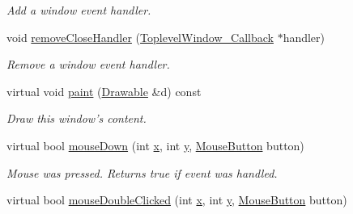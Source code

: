 \begin{DoxyCompactItemize}
\begin{DoxyCompactList}\small\item\em Add a window event handler. \end{DoxyCompactList}\item 
\hypertarget{classGUI_1_1ToplevelWindow_a378d60dec37b6321b97cdd971e9a7b50}{void \hyperlink{classGUI_1_1ToplevelWindow_a378d60dec37b6321b97cdd971e9a7b50}{remove\-Close\-Handler} (\hyperlink{structGUI_1_1ToplevelWindow__Callback}{Toplevel\-Window\-\_\-\-Callback} $\ast$handler)}\label{classGUI_1_1ToplevelWindow_a378d60dec37b6321b97cdd971e9a7b50}

\begin{DoxyCompactList}\small\item\em Remove a window event handler. \end{DoxyCompactList}\item 
\hypertarget{classGUI_1_1ToplevelWindow_afa0a4bb06257a13ba1a36857b86d1c04}{virtual void \hyperlink{classGUI_1_1ToplevelWindow_afa0a4bb06257a13ba1a36857b86d1c04}{paint} (\hyperlink{classGUI_1_1Drawable}{Drawable} \&d) const }\label{classGUI_1_1ToplevelWindow_afa0a4bb06257a13ba1a36857b86d1c04}

\begin{DoxyCompactList}\small\item\em Draw this window's content. \end{DoxyCompactList}\item 
\hypertarget{classGUI_1_1ToplevelWindow_aac0ee5b192f8f8c19d16e9326105cd89}{virtual bool \hyperlink{classGUI_1_1ToplevelWindow_aac0ee5b192f8f8c19d16e9326105cd89}{mouse\-Down} (int \hyperlink{classGUI_1_1Window_a6ca6a80ca00c9e1d8ceea8d3d99a657d}{x}, int \hyperlink{classGUI_1_1Window_a0ee8e923aff2c3661fc2e17656d37adf}{y}, \hyperlink{namespaceGUI_ad06082a7b02aa73697f39eb8e0856de9}{Mouse\-Button} button)}\label{classGUI_1_1ToplevelWindow_aac0ee5b192f8f8c19d16e9326105cd89}

\begin{DoxyCompactList}\small\item\em Mouse was pressed. Returns true if event was handled. \end{DoxyCompactList}\item 
\hypertarget{classGUI_1_1ToplevelWindow_a48816a1de37aeceea49ef4db9e47a3cc}{virtual bool \hyperlink{classGUI_1_1ToplevelWindow_a48816a1de37aeceea49ef4db9e47a3cc}{mouse\-Double\-Clicked} (int \hyperlink{classGUI_1_1Window_a6ca6a80ca00c9e1d8ceea8d3d99a657d}{x}, int \hyperlink{classGUI_1_1Window_a0ee8e923aff2c3661fc2e17656d37adf}{y}, \hyperlink{namespaceGUI_ad06082a7b02aa73697f39eb8e0856de9}{Mouse\-Button} button)}\label{classGUI_1_1ToplevelWindow_a48816a1de37aeceea49ef4db9e47a3cc}


\end{DoxyCompactItemize}
